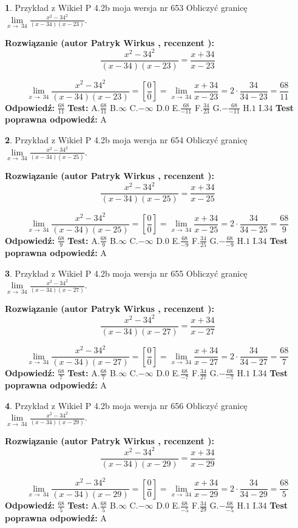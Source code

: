\documentclass[12pt, a4paper]{article}
\theoremstyle{definition} %
\newtheorem{zad}{}
\newcommand{\zadStart}[1]{\begin{zad}#1\newline}
\newcommand{\zadStop}{\end{zad}}
\newcommand{\rozwStart}[2]{\noindent \textbf{Rozwiązanie (autor #1 , recenzent #2): }\newline}
\newcommand{\rozwStop}{\newline}
\newcommand{\odpStart}{\noindent \textbf{Odpowiedź:}\newline}
\newcommand{\odpStop}{\newline}
\newcommand{\testStart}{\noindent \textbf{Test:}\newline}
\newcommand{\testStop}{\newline}
\newcommand{\kluczStart}{\noindent \textbf{Test poprawna odpowiedź:}\newline}
\newcommand{\kluczStop}{\newline}
\begin{document}
\zadStart{Przykład z Wikieł P 4.2b moja wersja nr 653}
Obliczyć granicę $\lim\limits_{x\to\ 34}\frac{x^{2}-34^{2}}{(x-34)(x-23)}$.
\zadStop
\rozwStart{Patryk Wirkus}{}
$$\frac{x^{2}-34^{2}}{(x-34)(x-23)}=\frac{x+34}{x-23}$$

$$\lim\limits_{x\to\ 34}\frac{x^{2}-34^{2}}{(x-34)(x-23)}=[\frac{0}{0}]=\lim\limits_{x\to\ 34}\frac{x+34}{x-23}=2 \cdot \frac{34}{34-23} = \frac{68}{11}$$
\rozwStop
\odpStart
$\frac{68}{11}$
\odpStop
\testStart
A.$\frac{68}{11}$
B.$\infty$
C.$-\infty$
D.$0$
E.$\frac{68}{-11}$
F.$\frac{34}{23}$
G.$-\frac{68}{-11}$
H.$1$
I.$34$
\testStop
\kluczStart
A
\kluczStop



\zadStart{Przykład z Wikieł P 4.2b moja wersja nr 654}
Obliczyć granicę $\lim\limits_{x\to\ 34}\frac{x^{2}-34^{2}}{(x-34)(x-25)}$.
\zadStop
\rozwStart{Patryk Wirkus}{}
$$\frac{x^{2}-34^{2}}{(x-34)(x-25)}=\frac{x+34}{x-25}$$

$$\lim\limits_{x\to\ 34}\frac{x^{2}-34^{2}}{(x-34)(x-25)}=[\frac{0}{0}]=\lim\limits_{x\to\ 34}\frac{x+34}{x-25}=2 \cdot \frac{34}{34-25} = \frac{68}{9}$$
\rozwStop
\odpStart
$\frac{68}{9}$
\odpStop
\testStart
A.$\frac{68}{9}$
B.$\infty$
C.$-\infty$
D.$0$
E.$\frac{68}{-9}$
F.$\frac{34}{25}$
G.$-\frac{68}{-9}$
H.$1$
I.$34$
\testStop
\kluczStart
A
\kluczStop



\zadStart{Przykład z Wikieł P 4.2b moja wersja nr 655}
Obliczyć granicę $\lim\limits_{x\to\ 34}\frac{x^{2}-34^{2}}{(x-34)(x-27)}$.
\zadStop
\rozwStart{Patryk Wirkus}{}
$$\frac{x^{2}-34^{2}}{(x-34)(x-27)}=\frac{x+34}{x-27}$$

$$\lim\limits_{x\to\ 34}\frac{x^{2}-34^{2}}{(x-34)(x-27)}=[\frac{0}{0}]=\lim\limits_{x\to\ 34}\frac{x+34}{x-27}=2 \cdot \frac{34}{34-27} = \frac{68}{7}$$
\rozwStop
\odpStart
$\frac{68}{7}$
\odpStop
\testStart
A.$\frac{68}{7}$
B.$\infty$
C.$-\infty$
D.$0$
E.$\frac{68}{-7}$
F.$\frac{34}{27}$
G.$-\frac{68}{-7}$
H.$1$
I.$34$
\testStop
\kluczStart
A
\kluczStop



\zadStart{Przykład z Wikieł P 4.2b moja wersja nr 656}
Obliczyć granicę $\lim\limits_{x\to\ 34}\frac{x^{2}-34^{2}}{(x-34)(x-29)}$.
\zadStop
\rozwStart{Patryk Wirkus}{}
$$\frac{x^{2}-34^{2}}{(x-34)(x-29)}=\frac{x+34}{x-29}$$

$$\lim\limits_{x\to\ 34}\frac{x^{2}-34^{2}}{(x-34)(x-29)}=[\frac{0}{0}]=\lim\limits_{x\to\ 34}\frac{x+34}{x-29}=2 \cdot \frac{34}{34-29} = \frac{68}{5}$$
\rozwStop
\odpStart
$\frac{68}{5}$
\odpStop
\testStart
A.$\frac{68}{5}$
B.$\infty$
C.$-\infty$
D.$0$
E.$\frac{68}{-5}$
F.$\frac{34}{29}$
G.$-\frac{68}{-5}$
H.$1$
I.$34$
\testStop
\kluczStart
A
\kluczStop
\end{document}
